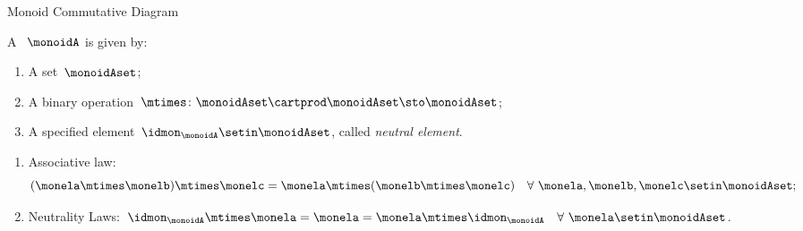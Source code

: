 \begin{marginfigure}
    \centering
    \caption{Monoid Commutative Diagram}
    \label{fig:monoid-commutative-diagram}
\end{marginfigure}
\begin{ctdefinition}[Monoid]
    \label{def:monoid}
    A ~$\monoidA$ is given by:
    \begin{body}
        \constit
        \begin{enumerate}
            \item A set~$\monoidAset$;
            \item A binary operation~$\mtimes \colon \monoidAset \cartprod \monoidAset \sto \monoidAset$;
            \item A specified element~$\idmon_\monoidA \setin \monoidAset$, called \emph{neutral element}.
        \end{enumerate}
        \condit
        \begin{enumerate}
            \item Associative law:
                  \begin{equation} \label{eq:monoid-associative-law}
                      (\monela\mtimes  \monelb)\mtimes  \monelc=
                      \monela\mtimes  (\monelb\mtimes  \monelc) \quad  \forall \  \monela, \monelb, \monelc \setin \monoidAset;
                  \end{equation}
            \item Neutrality Laws:~$\idmon_\monoidA \mtimes \monela=\monela=\monela \mtimes  \idmon_\monoidA \quad  \forall \ \monela \setin \monoidAset $.
        \end{enumerate}
    \end{body}
\end{ctdefinition}




